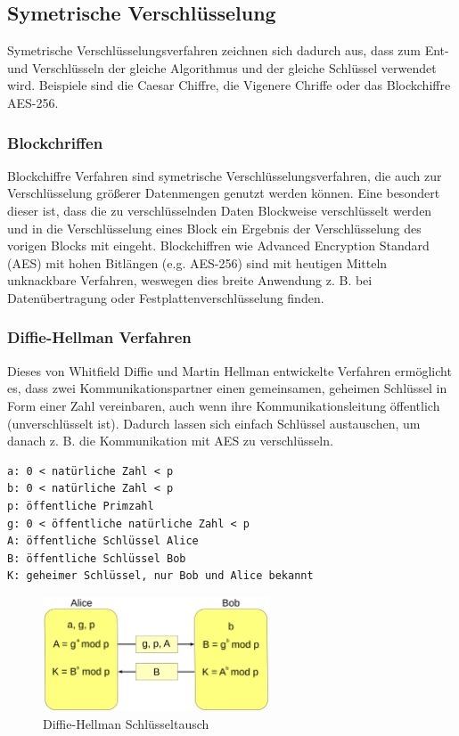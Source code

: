 \subsection{Symetrische Verschlüsselung}

Symetrische Verschlüsselungsverfahren zeichnen sich dadurch aus, dass zum
Ent- und Verschlüsseln der gleiche Algorithmus und der gleiche Schlüssel verwendet
wird. Beispiele sind die Caesar Chiffre, die Vigenere Chriffe oder das Blockchiffre AES-256.

\subsubsection{Blockchriffen}

Blockchiffre Verfahren sind symetrische Verschlüsselungsverfahren,
die auch zur Verschlüsselung größerer Datenmengen genutzt werden können.
Eine besondert dieser ist, dass die zu verschlüsselnden Daten Blockweise
verschlüsselt werden und in die Verschlüsselung eines Block ein Ergebnis
der Verschlüsselung des vorigen Blocks mit eingeht.
Blockchiffren wie Advanced Encryption Standard (AES) mit hohen Bitlängen (e.g. AES-256)
sind mit heutigen Mitteln unknackbare Verfahren, weswegen dies breite Anwendung
z. B. bei Datenübertragung oder Festplattenverschlüsselung finden.

\subsubsection{Diffie-Hellman Verfahren}

Dieses von Whitfield Diffie und Martin Hellman entwickelte Verfahren ermöglicht es,
dass zwei Kommunikationspartner einen gemeinsamen, geheimen Schlüssel in Form einer Zahl
vereinbaren, auch wenn ihre Kommunikationsleitung öffentlich (unverschlüsselt ist).
Dadurch lassen sich einfach Schlüssel austauschen, um danach z. B. die Kommunikation
mit AES zu verschlüsseln.

\begin{lstlisting}
a: 0 < natürliche Zahl < p
b: 0 < natürliche Zahl < p
p: öffentliche Primzahl
g: 0 < öffentliche natürliche Zahl < p
A: öffentliche Schlüssel Alice
B: öffentliche Schlüssel Bob
K: geheimer Schlüssel, nur Bob und Alice bekannt
\end{lstlisting}

\begin{figure}[H]
    \centering
    \includegraphics[width=0.6\textwidth]{images/diffie-hellman.png}
    \caption{Diffie-Hellman Schlüsseltausch}
\end{figure}

